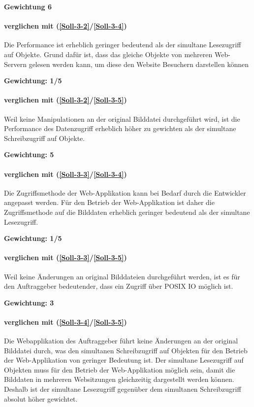 \textbf{Gewichtung 6}

\paragraph*{ verglichen mit  (\ref{Soll-3-2}/\ref{Soll-3-4})}
Die Performance ist erheblich geringer bedeutend als der simultane Lesezugriff auf Objekte. Grund dafür ist, dass das gleiche Objekte von mehreren Web-Servern gelesen werden kann, um diese den Website Besuchern darstellen können 

\textbf{Gewichtung: 1/5}

\paragraph*{ verglichen mit  (\ref{Soll-3-2}/\ref{Soll-3-5})}
Weil keine Manipulationen an der original Bilddatei durchgeführt wird, ist die Performance des Datenzugriff erheblich höher zu gewichten als der simultane Schreibzugriff auf Objekte. 

\textbf{Gewichtung: 5}


\paragraph*{ verglichen mit  (\ref{Soll-3-3}/\ref{Soll-3-4})}
Die Zugriffsmethode der Web-Applikation kann bei Bedarf durch die Entwickler angepasst werden. Für den Betrieb der Web-Applikation ist daher die Zugriffsmethode auf die Bilddaten erheblich geringer bedeutend als der simultane Lesezugriff.

\textbf{Gewichtung: 1/5}


\paragraph*{ verglichen mit  (\ref{Soll-3-3}/\ref{Soll-3-5})}
Weil keine Änderungen an original Bilddateien durchgeführt werden, ist es für den Auftraggeber bedeutender, dass ein Zugriff über POSIX IO möglich ist.

\textbf{Gewichtung: 3}


\paragraph*{ verglichen mit  (\ref{Soll-3-4}/\ref{Soll-3-5})}
Die Webapplikation des Auftraggeber führt keine Änderungen an der original Bilddatei durch, was den simultanen Schreibzugriff auf Objekten für den Betrieb der Web-Applikation von geringer Bedeutung ist. Der simultane Lesezugriff auf Objekten muss für den Betrieb der Web-Applikation möglich sein, damit die Bilddaten in mehreren Websitzungen gleichzeitig dargestellt werden können. Deshalb ist der simultane Lesezugriff gegenüber dem simultanen Schreibzugriff absolut höher gewichtet.

